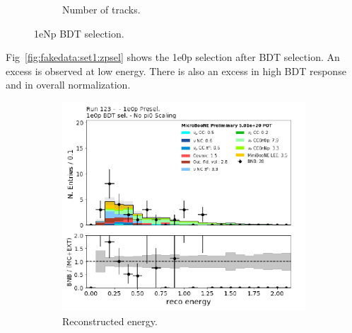\begin{figure}[H]
\begin{center}
\begin{subfigure}[b]{0.45\textwidth}
    \caption{\label{fig:fakedata:set1:Np_postsel_ntracks} Number of tracks.}
    \end{subfigure}
\caption{\label{fig:fakedata:set1:npsel} 1eNp BDT selection.}
\end{center}
\end{figure}

Fig~\ref{fig:fakedata:set1:zpsel} shows the 1e0p selection after BDT selection.  An excess is observed at low energy. There is also an excess in high BDT response and in overall normalization.

\begin{figure}[H] 
\begin{center}
    \begin{subfigure}[b]{0.3\textwidth}
    \centering
    \includegraphics[width=1.00\textwidth]{Fakedata/set1/zp_postsel_recoe.pdf}
    \caption{\label{fig:fakedata:set1:zp_postsel_recoe} Reconstructed energy.}
    \end{subfigure}
    \begin{subfigure}[b]{0.3\textwidth}
    \centering

\end{subfigure}
\end{center}
\end{figure}
